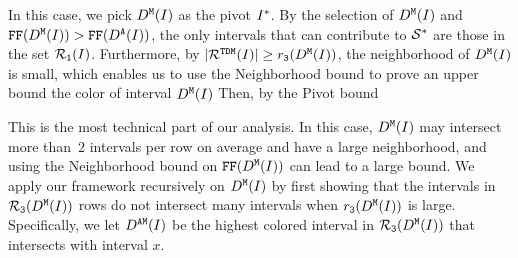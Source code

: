 In this case, we pick $D^\texttt{M}(I)$ as the pivot $I^*$.
By the selection of $D^\texttt{M}(I)$ and $\text{\texttt{FF}}(D^\texttt{M}(I)) > \text{\texttt{FF}}(D^\texttt{A}(I))$, the only intervals that can contribute to $\mathcal{S}^*$ are those in the set $\mathcal{R}_\texttt{1}(I)$.
Furthermore, by $|\mathcal{R}^{\texttt{TDM}}(I)| \geq r_\texttt{3}(D^\texttt{M}(I))$, the neighborhood of $D^\texttt{M}(I)$ is small, which enables us to use the Neighborhood bound to prove an upper bound the color of interval $D^\texttt{M}(I)$\shortversion{:} 
Then, by the Pivot bound\shortversion{:} 




This is the most technical part of our analysis.
In this case, $D^\texttt{M}(I)$ may intersect more than~$2$ intervals per row on average and have a large neighborhood, and using the Neighborhood bound on $\text{\texttt{FF}}(D^\texttt{M}(I))$ can lead to a large bound.
We apply our framework recursively on $D^\texttt{M}(I)$ by first showing that the intervals in $\mathcal{R}_\texttt{3}(D^\texttt{M}(I))$ rows do not intersect many intervals when $r_\texttt{3}(D^\texttt{M}(I))$ is large.
Specifically, we let $D^\texttt{AM}(I)$ be the highest colored interval in $\mathcal{R}_\texttt{3}(D^\texttt{M}(I))$ that intersects with interval $x$.

